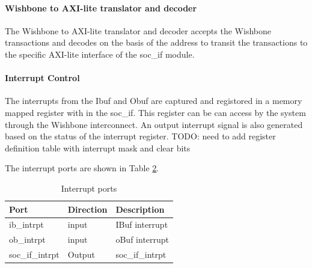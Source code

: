 \begin{table}[hbt]
\begin{tabular}{|l|l|l|l|}
\bottomrule
\end{tabular}
\label{tab:socif_southbound}
\end{table}


\paragraph{Wishbone to AXI-lite translator and decoder } 
The Wishbone to AXI-lite translator and decoder accepts the Wishbone transactions and decodes on the basis of the address to transit the transactions to the specific AXI-lite interface of the soc\_if module. \\

\paragraph{Interrupt Control}  
The interrupts from the Ibuf and Obuf are captured and registored in a memory
mapped register with in the soc\_if. This register can be can access by the
system through the Wishbone interconnect.  An output interrupt signal is also
generated based on the status of the interrupt register.
TODO: need to add register definition table with interrupt mask and clear bits
  
The interrupt ports are shown in Table \ref{tab:socif_intr}.  

\begin{table}[hbt]
\caption{Interrupt ports}
\begin{tabular}{|l|l|l|}
\toprule
Port  & Direction & Description  \\
\midrule
	\hline ib\_intrpt & input & IBuf interrupt \\
	\hline ob\_intrpt & input & oBuf interrupt\\
	\hline soc\_if\_intrpt & Output & soc\_if\_intrpt\\

\bottomrule
\end{tabular}
\label{tab:socif_intr}
\end{table}
